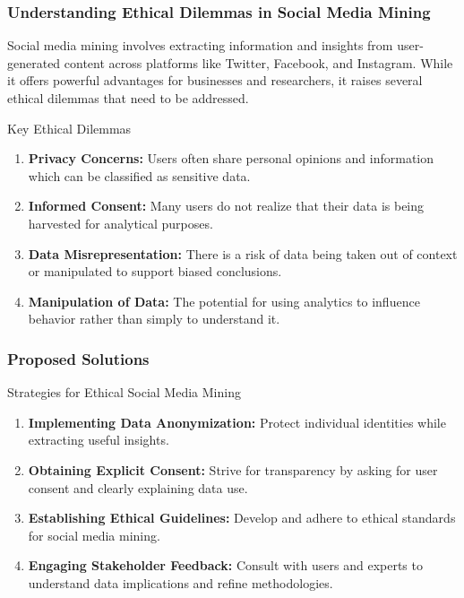 \documentclass{beamer}
\begin{document}
\begin{frame}[fragile]
    \frametitle{Understanding Ethical Dilemmas in Social Media Mining}
    Social media mining involves extracting information and insights from user-generated content across platforms like Twitter, Facebook, and Instagram. While it offers powerful advantages for businesses and researchers, it raises several ethical dilemmas that need to be addressed.

    \begin{block}{Key Ethical Dilemmas}
        \begin{enumerate}
            \item \textbf{Privacy Concerns:} Users often share personal opinions and information which can be classified as sensitive data.
            \item \textbf{Informed Consent:} Many users do not realize that their data is being harvested for analytical purposes.
            \item \textbf{Data Misrepresentation:} There is a risk of data being taken out of context or manipulated to support biased conclusions.
            \item \textbf{Manipulation of Data:} The potential for using analytics to influence behavior rather than simply to understand it.
        \end{enumerate}
    \end{block}
\end{frame}

\begin{frame}[fragile]
    \frametitle{Proposed Solutions}
    \begin{block}{Strategies for Ethical Social Media Mining}
        \begin{enumerate}
            \item \textbf{Implementing Data Anonymization:} Protect individual identities while extracting useful insights.
            \item \textbf{Obtaining Explicit Consent:} Strive for transparency by asking for user consent and clearly explaining data use.
            \item \textbf{Establishing Ethical Guidelines:} Develop and adhere to ethical standards for social media mining.
            \item \textbf{Engaging Stakeholder Feedback:} Consult with users and experts to understand data implications and refine methodologies.
        \end{enumerate}
    \end{block}
\end{frame}
\end{document}

